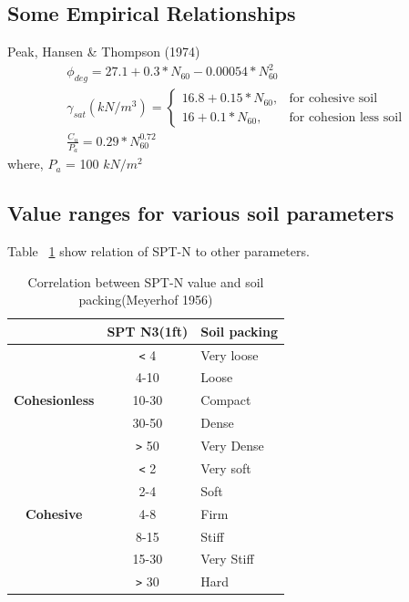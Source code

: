 \subsection{Some Empirical Relationships} \label{emp-form}
Peak, Hansen \& Thompson (1974)
\begin{gather}
{\phi}_{deg}=27.1+0.3*N_{60}-0.00054*N_{60}^2 \label{phi-form}\\
{\gamma}_{sat}(kN/m^3)= \begin{cases}
    16.8+0.15*N_{60}, & \text{for cohesive soil}\\
    16+0.1*N_{60}, & \text{for cohesion less soil}
    \end{cases}\\
\frac{C_u}{P_a} = 0.29*N_{60}^{0.72} \label{cu-form}
\end{gather}
where, $P_a$ = 100 $kN/m^2$

\subsection{Value ranges for various soil parameters}
Table ~\ref{cbsf-table} show relation of SPT-N to other parameters.

\begin{table}
  \centering
  \caption{Correlation between SPT-N value and soil packing(Meyerhof 1956)}
  \label{cbsf-table}
  \begin{tabular}{|c|c|l|}
  \hline &\bfseries{SPT N3(1ft)} & \bfseries{Soil packing} \\
  \hline \multirow{5}{*}{\begin{sideways}\bfseries{Cohesionless}\end{sideways}} & \verb"<" 4 & Very loose \\
  \cline{2-3} & 4-10 & Loose \\
  \cline{2-3} & 10-30 & Compact \\
  \cline{2-3} & 30-50 & Dense \\
  \cline{2-3} & \verb">" 50 & Very Dense \\
  \hline \multirow{5}{*}{\begin{sideways}\bfseries{Cohesive}\end{sideways}} & \verb"<" 2 & Very soft \\
  \cline{2-3} & 2-4 & Soft \\
  \cline{2-3} & 4-8 & Firm \\
  \cline{2-3} & 8-15 & Stiff \\
  \cline{2-3} & 15-30 & Very Stiff \\
  \cline{2-3} & \verb">" 30 & Hard \\
  \hline 
  \end{tabular}
\end{table}

